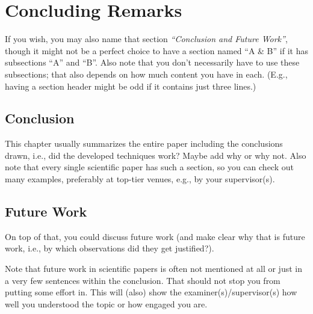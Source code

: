 \chapter{Concluding Remarks}\label{chap:conclusion}

If you wish, you may also name that section \emph{``Conclusion and Future Work''}, though it might not be a perfect choice to have a section named ``A \& B'' if it has subsections ``A'' and ``B''. Also note that you don't necessarily have to use these subsections; that also depends on how much content you have in each. (E.g., having a section header might be odd if it contains just three lines.)


\section{Conclusion}

This chapter usually summarizes the entire paper including the conclusions drawn, i.e., did the developed techniques work? Maybe add why or why not. Also note that every single scientific paper has such a section, so you can check out many examples, preferably at top-tier venues, e.g., by your supervisor(s).


\section{Future Work}

On top of that, you could discuss future work (and make clear why that is future work, i.e., by which observations did they get justified?).

Note that future work in scientific papers is often not mentioned at all or just in a very few sentences within the conclusion. That should not stop you from putting some effort in. This will (also) show the examiner(s)/supervisor(s) how well you understood the topic or how engaged you are.
